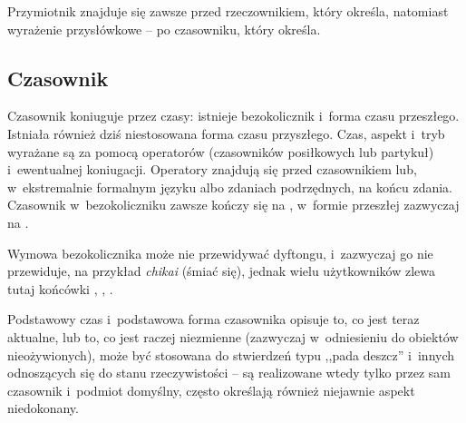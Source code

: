 \begin{spacing}{1.1}

Przymiotnik znajduje się zawsze przed rzeczownikiem, który określa, natomiast
wyrażenie przysłówkowe -- po czasowniku, który określa.


\subsection{Czasownik}

Czasownik koniuguje przez czasy: istnieje bezokolicznik i~forma czasu
przeszłego. Istniała również dziś niestosowana forma czasu przyszłego. Czas,
aspekt i~tryb wyrażane są za pomocą operatorów (czasowników posiłkowych lub
partykuł) i~ewentualnej koniugacji. Operatory znajdują się przed czasownikiem
lub, w~ekstremalnie formalnym języku albo zdaniach podrzędnych, na końcu zdania.
Czasownik w~bezokoliczniku zawsze kończy się na , w~formie przeszłej
zazwyczaj na .

Wymowa bezokolicznika może nie przewidywać dyftongu, i~zazwyczaj go nie
przewiduje, na przykład \emph{chikai}  (śmiać się), jednak wielu
użytkowników zlewa tutaj końcówki , , .

\skipline

Podstawowy czas i~podstawowa forma czasownika opisuje to, co jest teraz
aktualne, lub to, co jest raczej niezmienne (zazwyczaj w~odniesieniu do obiektów
nieożywionych), może być stosowana do stwierdzeń typu ,,pada deszcz'' i~innych
odnoszących się do stanu rzeczywistości -- są realizowane wtedy tylko przez sam
czasownik i~podmiot domyślny, często określają również niejawnie aspekt
niedokonany.





\end{spacing}

